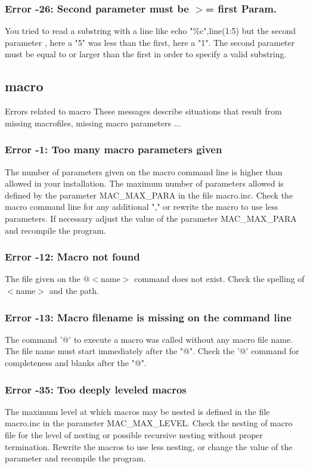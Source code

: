 \subsubsection{Error -26: Second parameter must be $> $= first Param.}
\par
You tried to read a substring with a line like 
echo "\%c",line(1:5) 
but the second parameter , here a "5" was less than the first, here a "1". 
The second parameter must be equal to or larger than the first in order 
to specify a valid substring. 
\subsection*{macro}
\par
Errors related to macro 
These messages describe situations that result from missing macrofiles, 
missing macro parameters ... 
\par
\subsubsection{Error -1: Too many macro parameters given}
\par
The number of parameters given on the macro command line is higher 
than allowed in your installation. The maximum number of parameters 
allowed is defined by the parameter MAC\_MAX\_PARA in the file 
macro.inc. 
Check the macro command line for any additional "," or rewrite the 
macro to use less parameters. If necessary adjust the value of the 
parameter MAC\_MAX\_PARA and recompile the program. 
\subsubsection{Error -12: Macro not found}
\par
The file given on the @$ <$name$> $ command does not exist. Check the 
spelling of $ <$name$> $ and the path. 
\subsubsection{Error -13: Macro filename is missing on the command line}
\par
The command '@' to execute a macro was called without any macro 
file name. The file name must start immediately after the "@". 
Check the '@' command for completeness and blanks after the "@". 
\subsubsection{Error -35: Too deeply leveled macros}
\par
The maximum level at which macros may be nested is defined in the 
file macro.inc in the parameter MAC\_MAX\_LEVEL. Check the nesting of 
macro file for the level of nesting or possible recursive nesting 
without proper termination. Rewrite the macros to use less nesting, 
or change the value of the parameter and recompile the program. 
